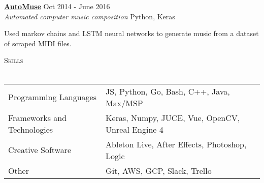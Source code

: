\documentclass[11pt]{extarticle}
\newcommand{\lineunder} {
	\vspace*{-8pt} \\
	\hspace*{-18pt} \hrulefill \\
}
\newcommand{\header} [1] {
	{\hspace*{-18pt}\vspace*{6pt} \textsc{#1}}
	\vspace*{-6pt} \lineunder
}
\begin{document}
\noindent
\href{https://github.com/nacgarg/AutoMuse}{\textbf{AutoMuse}} \hfill Oct 2014 - June 2016\\
\textit{Automated computer music composition} \hfill Python, Keras \\
\vspace{-25pt}
\begin{paragraph}{}
Used markov chains and LSTM neural networks to generate music from a dataset of scraped MIDI files. \\ 

\end{paragraph}

\noindent
\header{Skills}
\noindent

\begin{tabular}{ l l }
	Programming Languages & JS, Python, Go, Bash, C++, Java, Max/MSP \\
	Frameworks and Technologies & Keras, Numpy, JUCE, Vue, OpenCV, Unreal Engine 4 \\
	Creative Software             & Ableton Live, After Effects, Photoshop, Logic    \\
	Other                  & Git, AWS, GCP, Slack, Trello       \\
\end{tabular}
\vspace{3mm}
\noindent
\begin{center}
\end{center}
\end{document}
